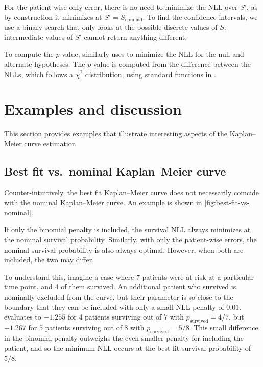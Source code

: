 \documentclass[article]{jss}
\newcommand{\KM}{Kaplan--Meier} %
\begin{document}
For the patient-wise-only error, there is no need to minimize the NLL over \(S'\), as by construction it minimizes at \(S'=S_\text{nominal}\).  To find the confidence intervals, we use a binary search that only looks at the possible discrete values of \(S\): intermediate values of \(S'\) cannot return anything different.

To compute the \(p\) value,  similarly uses  to minimize the NLL for the null and alternate hypotheses.  The \(p\) value is computed from the difference between the NLLs, which follows a \(\chi^2\) distribution, using standard functions in .

\section{Examples and discussion}

This section provides examples that illustrate interesting aspects of the \KM{} curve estimation.

\subsection%
[Best fit vs. nominal \KM{} curve]%
{Best fit vs.\ nominal \KM{} curve}

Counter-intuitively, the best fit \KM{} curve does not necessarily coincide with the nominal \KM{} curve.  An example is shown in \cref{fig:best-fit-vs-nominal}.

If only the binomial penalty is included, the survival NLL always minimizes at the nominal survival probability.  Similarly, with only the patient-wise errors, the nominal survival probability is also always optimal.  However, when both are included, the two may differ.

To understand this, imagine a case where 7 patients were at risk at a particular time point, and 4 of them survived.  An additional patient who survived is nominally excluded from the curve, but their parameter is so close to the boundary that they can be included with only a small NLL penalty of \(0.01\)\@.   evaluates to \(-1.255\) for \(4\) patients surviving out of \(7\) with \(p_\text{survived}=4/7\), but \(-1.267\) for \(5\) patients surviving out of \(8\) with \(p_\text{survived}=5/8\).  This small difference in the binomial penalty outweighs the even smaller penalty for including the patient, and so the minimum NLL occurs at the best fit survival probability of \(5/8\).
\end{document}
